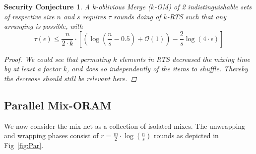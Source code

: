 \documentclass{llncs}
\newtheorem{seccjt}{Security Conjecture}
\begin{document}
\begin{seccjt}\label{sec:kOM}
A $k$-oblivious Merge ($k$-OM) of 2 indistinguishable sets of respective size $n$ and $s$ requires $\tau$ rounds doing of $k$-RTS such that any arranging is possible, with
$$ \tau(\epsilon) \leq \frac{n}{2\cdot k}  \cdot \left [ \left( \log \left (\frac{n}{s}-0.5\right) +\mathcal{O}\left(1\right) \right ) - \frac{2}{s} \log \left( 4 \cdot \epsilon\right) \right ] $$
\begin{proof}
We could see that permuting $k$ elements in RTS decreased the mixing time by at least a factor $k$, and does so independently of the items to shuffle. Thereby the decrease should still be relevant here.
\end{proof}
\end{seccjt}
%
\subsection{Parallel Mix-ORAM}\label{parallelMixORAM}
%
We now consider the mix-net as a collection of isolated mixes. The unwrapping and wrapping phases consist of $r= \frac{m}{2} \cdot \log \left (\frac{n}{s} \right ) $ rounds as depicted in Fig~\ref{fig:Par}.\\
\end{document}
